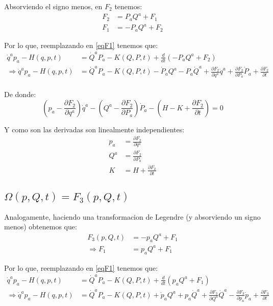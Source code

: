 \documentclass[paper=a4, fontsize=11pt,twoside]{scrartcl}
\begin{document}
Absorviendo el signo menos, en $F_{2}$ tenemos:
	\begin{align*}
		F_{2} &= P_{a}Q^{a} + F_{1} \\
		F_{1} &= -P_{a}Q^{a} + F_{2} 
	\end{align*}

Por lo que, reemplazando en \eqref{eqF1} tenemos que:
	\begin{align*}
		\dot{q}^{a}p_{a} - H(q,p,t) &=  \dot{Q}^{a}P_{a} - K(Q,P,t)  + \frac{d}{dt} \left( -P_{a}Q^{a} + F_{2} \right) \\ \label{eqF1}
\Rightarrow \dot{q}^{a}p_{a} - H(q,p,t) &=  \dot{Q}^{a}P_{a} - K(Q,P,t)  - \dot{P}_{a}Q^{a} - P_{a}\dot{Q}^{a}
										   +\frac{\partial F_{2}}{\partial q^{a}}\dot{q}^{a} 
										   +\frac{\partial F_{2}}{\partial P_{a}}\dot{P}_{a} + \frac{\partial F_{2}}{\partial t}\\
	\end{align*}
	
De donde:
	\begin{equation*}
		\left(p_{a} - \frac{\partial F_{2}}{\partial q^{a}} \right)\dot{q}^{a}
	   -\left( Q^{a} -\frac{\partial F_{2}}{\partial P_{a}} \right)\dot{P}_{a}
	   - \left(H - K + \frac{\partial F_{2}}{\partial t}\right)  = 0
	\end{equation*}

Y como son las derivadas son linealmente independientes:
	\begin{align*}
		p_{a} &= \frac{\partial F_{2}}{\partial q^{a}}\\
		Q^{a} &= \frac{\partial F_{2}}{\partial P_{a}} \\
		K &= H + \frac{\partial F_{2}}{\partial t}
	\end{align*}

\subsection{$\Omega(p,Q,t) = F_{3}(p,Q,t)$}

Analogamente, haciendo una transformacion de Legendre (y absorviendo un signo menos) obtenemos que:
	\begin{align*}
		F_{3}(p,Q,t) &= -p_{a}Q^{a} + F_{1} \\
		\Rightarrow F_{1} &= p_{a}Q^{a} + F_{1}
	\end{align*}
	
Por lo que, reemplazando en \eqref{eqF1} tenemos que:
	\begin{align*}
		\dot{q}^{a}p_{a} - H(q,p,t) &=  \dot{Q}^{a}P_{a} - K(Q,P,t)  + \frac{d}{dt} \left( p_{a}Q^{a} + F_{1} \right) \\ \label{eqF1}
\Rightarrow \dot{q}^{a}p_{a} - H(q,p,t) &=  \dot{Q}^{a}P_{a} - K(Q,P,t)  + \dot{p}_{a}Q^{a} + p_{a}\dot{Q}^{a}
										   +\frac{\partial F_{3}}{\partial Q^{a}}\dot{Q}^{a} 
										   -\frac{\partial F_{3}}{\partial p_{a}}\dot{p}_{a} + \frac{\partial F_{3}}{\partial t}\\
	\end{align*}
	
\end{document}
